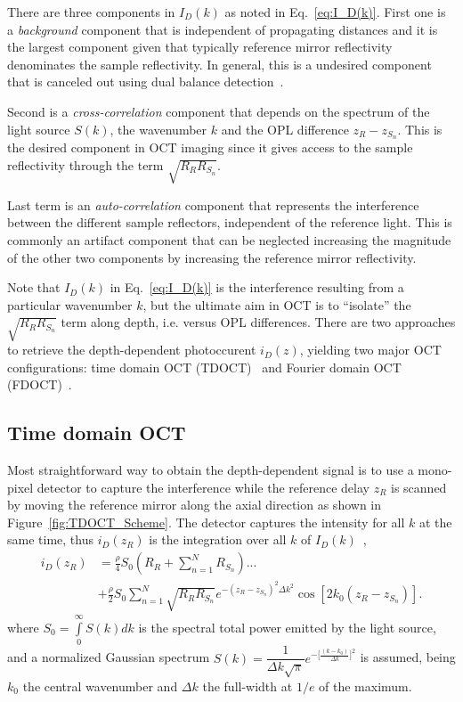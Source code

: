 There are three components in $I_D(k)$ as noted in Eq.~\eqref{eq:I_D(k)}. First one is a \textit{background} component that is independent of propagating distances and it is the largest component given that typically reference mirror reflectivity denominates the sample reflectivity. In general, this is a undesired component that is canceled out using dual balance detection~\cite{Podoleanu2000_Unbalanced}.

Second is a \textit{cross-correlation} component that depends on the spectrum of the light source $S(k)$, the wavenumber $k$ and the OPL difference $z_R-z_{S_n}$. This is the desired component in OCT imaging since it gives access to the sample reflectivity through the term $\sqrt{R_RR_{S_n}}$.

Last term is an \textit{auto-correlation} component that represents the interference between the different sample reflectors, independent of the reference light. This is commonly an artifact component that can be neglected increasing the magnitude of the other two components by increasing the reference mirror reflectivity.

Note that $I_D(k)$ in Eq.~\eqref{eq:I_D(k)} is the interference resulting from a particular wavenumber $k$, but the ultimate aim in OCT is to ``isolate'' the $\sqrt{R_RR_{S_n}}$ term along depth, i.e. versus OPL differences. There are two approaches to retrieve the depth-dependent photoccurent $i_D(z)$, yielding two major OCT configurations: time domain OCT (TDOCT)~\cite{Huang1991_Optical} and Fourier domain OCT (FDOCT)~\cite{Fercher1995_Measurement}.

\subsection{Time domain OCT}

Most straightforward way to obtain the depth-dependent signal is to use a mono-pixel detector to capture the interference while the reference delay $z_R$ is scanned by moving the reference mirror along the axial direction as shown in Figure~\ref{fig:TDOCT_Scheme}. The detector captures the intensity for all $k$ at the same time, thus $i_D(z_R)$ is the integration over all $k$ of $I_D(k)$~\cite{Izatt2015_Theory},
\begin{align}
    i_D(z_R) &= \frac{\rho}{4}S_0\left(R_R+\sum_{n=1}^N R_{S_n}\right)... \nonumber \\
    &+ \frac{\rho}{2}S_0 \sum_{n=1}^N \sqrt{R_RR_{S_n}} e^{-\left(z_R-z_{S_n}\right)^2 \Delta k^2}\cos\left[2k_0\left(z_R-z_{S_n}\right)\right].
\end{align}
where $S_0 = \int\limits_{0}^\infty S(k)dk$ is the spectral total power emitted by the light source, and a normalized Gaussian spectrum $S(k) =\dfrac{1}{\Delta k\sqrt{\pi}}e^{-\big[\frac{(k-k_0)}{\Delta k}\big]^2}$ is assumed, being $k_0$ the central wavenumber and $\Delta k$ the full-width at $1/e$ of the maximum.

